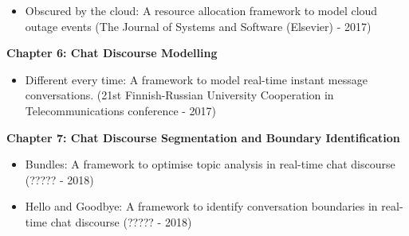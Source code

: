 \begin{itemize}
  \item Obscured by the cloud: A resource allocation framework to model cloud outage events (The Journal of Systems and Software (Elsevier) - 2017)
\end{itemize}


\textbf{Chapter 6: Chat Discourse Modelling}

\begin{itemize}
  \item Different every time: A framework to model real-time instant message conversations. (21st Finnish-Russian University Cooperation in Telecommunications conference - 2017)
\end{itemize}


\textbf{Chapter 7: Chat Discourse Segmentation and Boundary Identification}

\begin{itemize}
  \item Bundles: A framework to optimise topic analysis in real-time chat discourse (????? - 2018)
  \item Hello and Goodbye: A framework to identify conversation boundaries in real-time chat discourse (????? - 2018)
\end{itemize}
